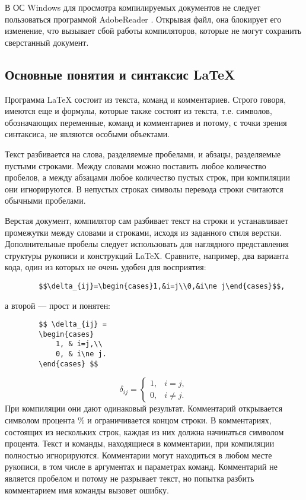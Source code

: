 \documentclass[a4paper, 14pt]{extarticle}
\newcommand{\n}{\par}
\begin{document}
	В ОС Windows для просмотра компилируемых документов не следует пользоваться программой AdobeReader . Открывая файл, она блокирует его изменение, что вызывает сбой работы компиляторов, которые не могут сохранить сверстанный документ.
	
	\subsection*{Основные понятия и синтаксис \LaTeX}
	Программа \LaTeX{} состоит из текста, команд и комментариев. Строго говоря, имеются еще и формулы, которые также состоят из текста, т.е. символов, обозначающих переменные, команд и комментариев и потому, с точки зрения синтаксиса, не являются особыми объектами.\n
	
	Текст разбивается на слова, разделяемые пробелами, и абзацы, разделяемые пустыми строками. Между словами можно поставить любое количество пробелов, а между абзацами любое количество пустых строк, при компиляции они игнорируются. В непустых строках символы перевода строки считаются обычными пробелами.\n
	
	Верстая документ, компилятор сам разбивает текст на строки и устанавливает промежутки между словами и строками, исходя из заданного стиля верстки. Дополнительные пробелы следует использовать для наглядного представления структуры рукописи и конструкций \LaTeX. Сравните, например, два варианта кода, один из которых не очень удобен для восприятия:
	\begin{lstlisting}
		$$\delta_{ij}=\begin{cases}1,&i=j\\0,&i\ne j\end{cases}$$,
	\end{lstlisting}
	а второй — прост и понятен:
	\begin{lstlisting}
		$$ \delta_{ij} =
		\begin{cases}
			1, & i=j,\\
			0, & i\ne j.
		\end{cases} $$
	\end{lstlisting}
	$$ \delta_{ij} =
	\begin{cases}
		1, & i=j,\\
		0, & i\ne j.
	\end{cases} $$
	При компиляции они дают одинаковый результат. Комментарий открывается символом процента \% и ограничивается концом строки. В комментариях, состоящих из нескольких строк, каждая из них должна начинаться символом процента. Текст и команды, находящиеся в комментарии, при компиляции полностью игнорируются. Комментарии могут находиться в любом месте рукописи, в том числе в аргументах и параметрах команд. Комментарий не является пробелом и потому не разрывает текст, но попытка разбить комментарием имя команды вызовет ошибку. 
		
\end{document}
